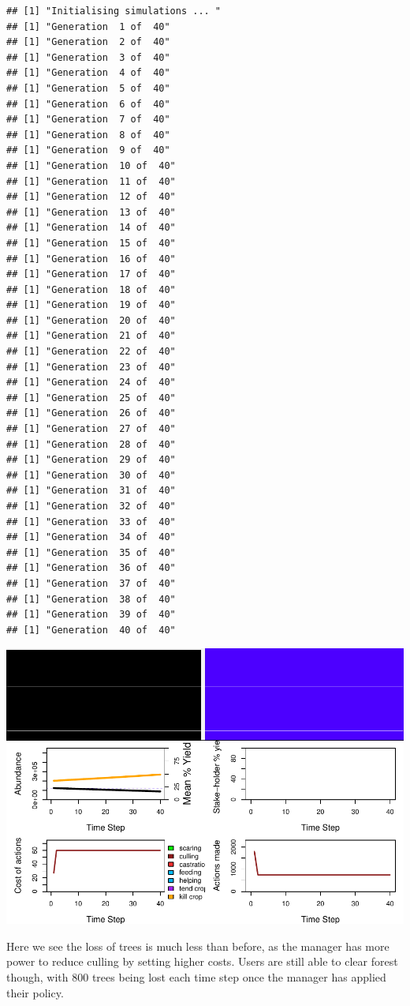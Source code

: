 \documentclass[
]{article}
\begin{document}
\begin{verbatim}
## [1] "Initialising simulations ... "
## [1] "Generation  1 of  40"
## [1] "Generation  2 of  40"
## [1] "Generation  3 of  40"
## [1] "Generation  4 of  40"
## [1] "Generation  5 of  40"
## [1] "Generation  6 of  40"
## [1] "Generation  7 of  40"
## [1] "Generation  8 of  40"
## [1] "Generation  9 of  40"
## [1] "Generation  10 of  40"
## [1] "Generation  11 of  40"
## [1] "Generation  12 of  40"
## [1] "Generation  13 of  40"
## [1] "Generation  14 of  40"
## [1] "Generation  15 of  40"
## [1] "Generation  16 of  40"
## [1] "Generation  17 of  40"
## [1] "Generation  18 of  40"
## [1] "Generation  19 of  40"
## [1] "Generation  20 of  40"
## [1] "Generation  21 of  40"
## [1] "Generation  22 of  40"
## [1] "Generation  23 of  40"
## [1] "Generation  24 of  40"
## [1] "Generation  25 of  40"
## [1] "Generation  26 of  40"
## [1] "Generation  27 of  40"
## [1] "Generation  28 of  40"
## [1] "Generation  29 of  40"
## [1] "Generation  30 of  40"
## [1] "Generation  31 of  40"
## [1] "Generation  32 of  40"
## [1] "Generation  33 of  40"
## [1] "Generation  34 of  40"
## [1] "Generation  35 of  40"
## [1] "Generation  36 of  40"
## [1] "Generation  37 of  40"
## [1] "Generation  38 of  40"
## [1] "Generation  39 of  40"
## [1] "Generation  40 of  40"
\end{verbatim}

\includegraphics{gmse_tenure_ongoing_files/figure-latex/ten_rep_3_plot-1.pdf}

Here we see the loss of trees is much less than before, as the manager
has more power to reduce culling by setting higher costs. Users are
still able to clear forest though, with 800 trees being lost each time
step once the manager has applied their policy.
\end{document}
